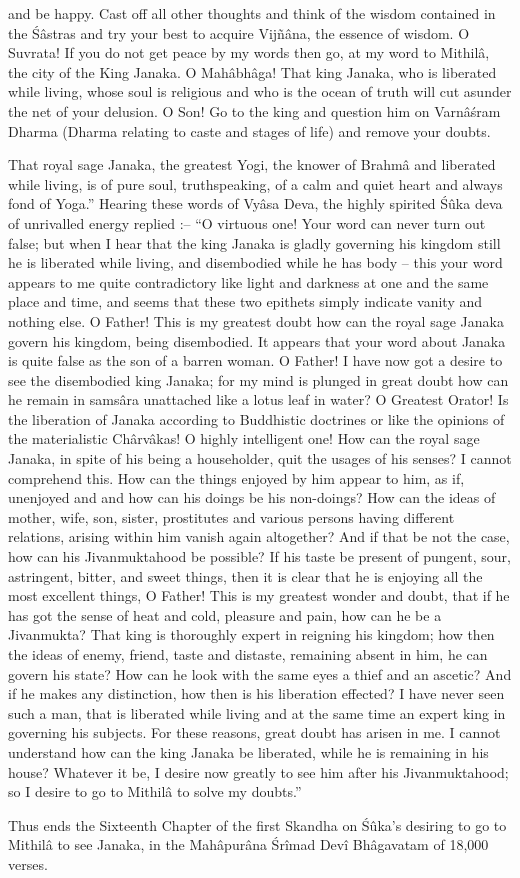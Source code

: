 and be happy. Cast off all other thoughts and think of the wisdom contained in the \'S\^astras and try your best to acquire Vijñ\^ana, the essence of wisdom. O Suvrata! If you do not get peace by my words then go, at my word to Mithil\^a, the city of the King Janaka. O Mah\^abh\^aga! That king Janaka, who is liberated while living, whose soul is religious and who is the ocean of truth will cut asunder the net of your delusion. O Son! Go to the king and question him on Varn\^a\'sram Dharma (Dharma relating to caste and stages of life) and remove your doubts.

That royal sage Janaka, the greatest Yogi, the knower of Brahm\^a and liberated while living, is of pure soul, truthspeaking, of a calm and quiet heart and always fond of Yoga.'' Hearing these words of Vy\^asa Deva, the highly spirited \'S\^uka deva of unrivalled energy replied :-- ``O virtuous one! Your word can never turn out false; but when I hear that the king Janaka is gladly governing his kingdom still he is liberated while living, and disembodied while he has body -- this your word appears to me quite contradictory like light and darkness at one and the same place and time, and seems that these two epithets simply indicate vanity and nothing else. O Father! This is my greatest doubt how can the royal sage Janaka govern his kingdom, being disembodied. It appears that your word about Janaka is quite false as the son of a barren woman. O Father! I have now got a desire to see the disembodied king Janaka; for my mind is plunged in great doubt how can he remain in sams\^ara unattached like a lotus leaf in water? O Greatest Orator! Is the liberation of Janaka according to Buddhistic doctrines or like the opinions of the materialistic Ch\^arv\^akas! O highly intelligent one! How can the royal sage Janaka, in spite of his being a householder, quit the usages of his senses? I cannot comprehend this. How can the things enjoyed by him appear to him, as if, unenjoyed and and how can his doings be his non-doings? How can the ideas of mother, wife, son, sister, prostitutes and various persons having different relations, arising within him vanish again altogether? And if that be not the case, how can his Jivanmuktahood be possible? If his taste be present of pungent, sour, astringent, bitter, and sweet things, then it is clear that he is enjoying all the most excellent things, O Father! This is my greatest wonder and doubt, that if he has got the sense of heat and cold, pleasure and pain, how can he be a Jivanmukta? That king is thoroughly expert in reigning his kingdom; how then the ideas of enemy, friend, taste and distaste, remaining absent in him, he can govern his state? How can he look with the same eyes a thief and an ascetic? And if he makes any distinction, how then is his liberation effected? I have never seen such a man, that is liberated while living and at the same time an expert king in governing his subjects. For these reasons, great doubt has arisen in me. I cannot understand how can the king Janaka be liberated, while he is remaining in his house? Whatever it be, I desire now greatly to see him after his Jivanmuktahood; so I desire to go to Mithil\^a to solve my doubts.''

Thus ends the Sixteenth Chapter of the first Skandha on \'S\^uka's desiring to go to Mithil\^a to see Janaka, in the Mah\^apur\^ana \'Sr\^imad Dev\^i Bh\^agavatam of 18,000 verses.